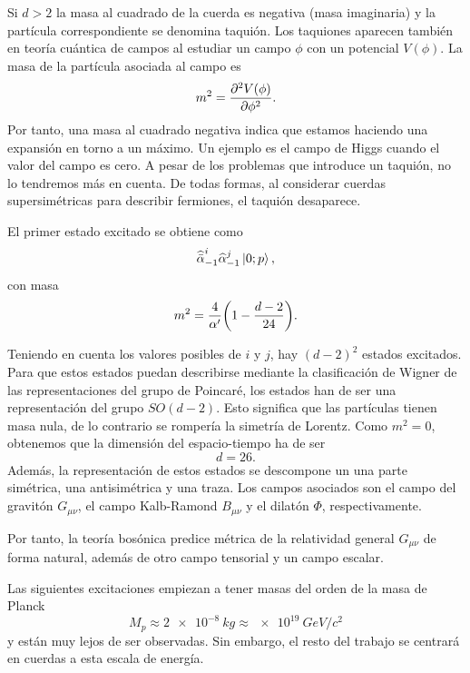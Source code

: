 Si $d>2$ la masa al cuadrado de la cuerda es negativa (masa imaginaria) y la partícula correspondiente se denomina taquión.
Los taquiones aparecen también en teoría cuántica de campos al estudiar un campo $\phi$ con un 
potencial $V(\phi)$.
La masa de la partícula asociada al campo es
\begin{equation}
  m^2 = \pdv[2]{V(\phi)}{\phi}.
\end{equation}
Por tanto, una masa al cuadrado negativa indica que estamos haciendo una expansión en torno
a un máximo. 
Un ejemplo es el campo de Higgs cuando el valor del campo es cero.
A pesar de los problemas que introduce un taquión, no lo tendremos más en cuenta. 
De todas formas, al considerar cuerdas supersimétricas para describir fermiones, el taquión
desaparece.

El primer estado excitado se obtiene como
\begin{equation}
  \widehat{\bar\alpha}_{-1}^i\widehat \alpha_{-1}^j\ket{0;p},
\end{equation}
con masa
\begin{equation}
  m^2 = \frac{4}{\alpha'}\qty(1-\frac{d-2}{24}).
\end{equation}

Teniendo en cuenta los valores posibles de $i$ y $j$, hay $(d-2)^2$ estados excitados.
Para que estos estados puedan describirse mediante la clasificación de Wigner de las
representaciones del grupo de Poincaré, los estados han de ser una representación del grupo  $SO(d-2)$.
Esto significa que las partículas tienen masa nula, de lo contrario se rompería la simetría
de Lorentz.
Como $m^2=0$, obtenemos que la dimensión del espacio-tiempo ha de ser
\begin{equation}
  d=26.
\end{equation}
Además, la representación de estos estados se descompone un una parte simétrica, una antisimétrica
y una traza. Los campos asociados son el campo del gravitón $G_{\mu\nu}$, el campo Kalb-Ramond $B_{\mu\nu}$
y el dilatón $\Phi$, respectivamente.

Por tanto, la teoría bosónica predice métrica de la relatividad general $G_{\mu\nu}$ de forma 
natural, además de otro campo tensorial y un campo escalar.

Las siguientes excitaciones empiezan a tener masas del orden de la masa de Planck
\begin{equation}
  M_p\approx\SI{2e-8}{kg} \approx \SI{e19}{GeV/c^2}
\end{equation}
y están muy lejos de ser observadas. Sin embargo, el resto del trabajo se centrará en cuerdas
a esta escala de energía.


